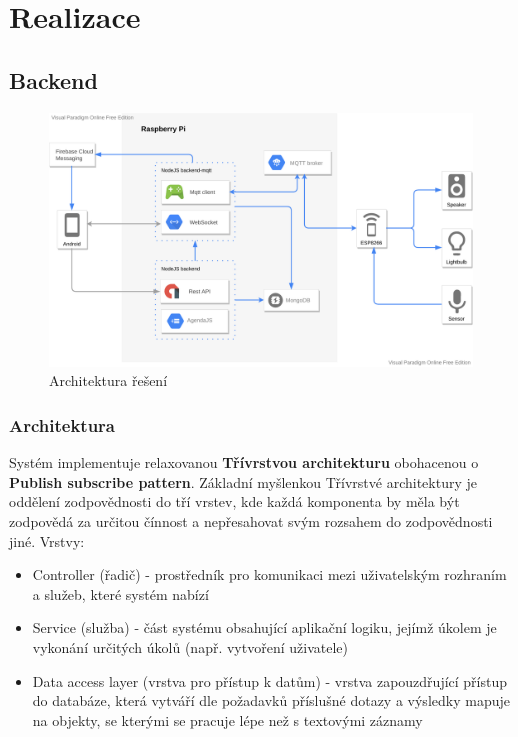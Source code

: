 \chapter{Realizace}


\section{Backend}
\begin{figure}[htbp]
    \centering
    \includegraphics[width=\textwidth]{img/architecture.pdf}
    \caption{Architektura řešení}
\end{figure}

\subsection{Architektura}
Systém implementuje relaxovanou \textbf{Třívrstvou architekturu} obohacenou o \textbf{Publish subscribe pattern}. Základní myšlenkou Třívrstvé architektury je oddělení zodpovědnosti do tří vrstev, kde každá komponenta by měla být zodpovědá za určitou čínnost a nepřesahovat svým rozsahem do zodpovědnosti jiné. Vrstvy:
\begin{itemize}
    \item Controller (řadič) - prostředník pro komunikaci mezi uživatelským rozhraním a služeb, které systém nabízí
    \item Service (služba) - část systému obsahující aplikační logiku, jejímž úkolem je vykonání určitých úkolů (např. vytvoření uživatele)
    \item Data access layer (vrstva pro přístup k datům) - vrstva zapouzdřující přístup do databáze, která vytváří dle požadavků příslušné dotazy a výsledky mapuje na objekty, se kterými se pracuje lépe než s textovými záznamy
\end{itemize}

